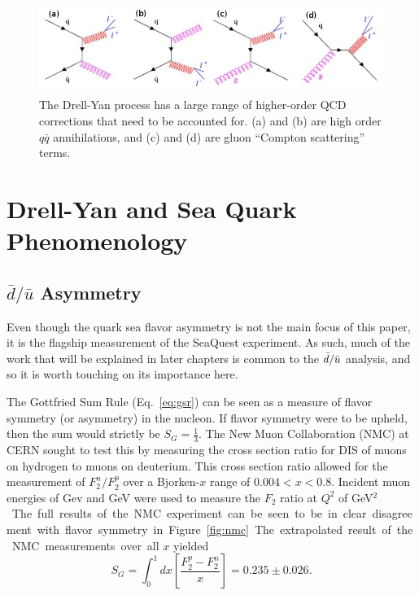 \begin{figure}[h]
	\centering
	\includegraphics[width=\textwidth]{figures/background/DY.jpeg}
	\caption{The Drell-Yan process has a large range of higher-order QCD corrections that need to be accounted for. 
		(a) and (b) are high order $q\bar{q}$ annihilations, and (c) and (d) are gluon ``Compton scattering'' terms.}
	\label{fig:nlo-dy}
\end{figure}

\section{Drell-Yan and Sea Quark Phenomenology}


\subsection{$\bar{d}/\bar{u}$ Asymmetry}

Even though the quark sea flavor asymmetry is not the main focus of this paper, it is the flagship measurement of the SeaQuest experiment. As such, much of the work that will be explained in later chapters is common to the $\bar{d}/\bar{u}$ analysis, and so it is worth touching on its importance here.

The Gottfried Sum Rule (Eq.~\ref{eq:gsr}) can be seen as a measure of flavor symmetry (or asymmetry) in the nucleon. If flavor symmetry were to be upheld, then the sum would strictly be $S_G = \frac{1}{3}$. The New Muon Collaboration (NMC) at CERN sought to test this by measuring the cross section ratio for DIS of muons on hydrogen to muons on deuterium\cite{Amaudruz:1991nw,Arneodo:1994sh}. This cross section ratio allowed for the measurement of $F_2^n/F_2^p$ over a Bjorken-$x$ range of $0.004 < x < 0.8$.  Incident muon energies of \unit[90]{Gev} and \unit[280]{GeV} were used to measure the $F_2$ ratio at $Q^2$ of \unit[4]{GeV$^2$}. The full results of the NMC experiment can be seen to be in clear disagreement with flavor symmetry in Figure~\ref{fig:nmc}. The extrapolated result of the NMC measurements over all $x$ yielded
\begin{equation}
S_G = \int_0^1 dx \left[ \frac{F_2^p - F_2^n}{x} \right] = 0.235 \pm 0.026.
\end{equation}

